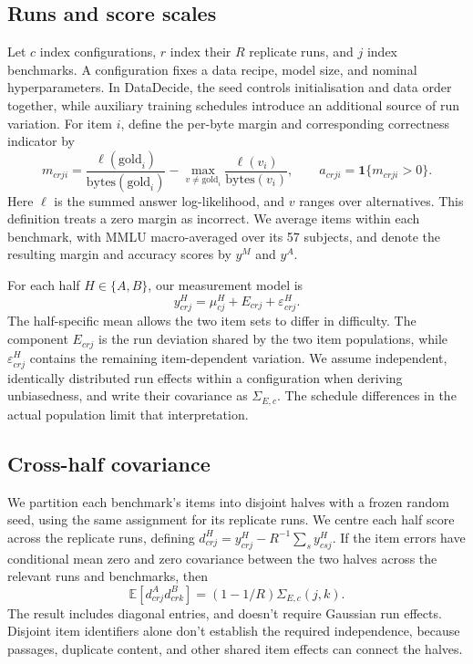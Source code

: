 \documentclass{article}
\begin{document}
\subsection{Runs and score scales}
Let $c$ index configurations, $r$ index their $R$ replicate runs, and $j$ index benchmarks. A configuration fixes a data recipe, model size, and nominal hyperparameters. In DataDecide, the seed controls initialisation and data order together, while auxiliary training schedules introduce an additional source of run variation. For item $i$, define the per-byte margin and corresponding correctness indicator by
\begin{equation}
m_{crji}=\frac{\ell(\mathrm{gold}_i)}{\mathrm{bytes}(\mathrm{gold}_i)}-
\max_{v\ne\mathrm{gold}_i}\frac{\ell(v_i)}{\mathrm{bytes}(v_i)},
\qquad a_{crji}=\mathbf{1}\{m_{crji}>0\}.
\label{eq:scores}
\end{equation}
Here $\ell$ is the summed answer log-likelihood, and $v$ ranges over alternatives. This definition treats a zero margin as incorrect. We average items within each benchmark, with MMLU macro-averaged over its 57 subjects, and denote the resulting margin and accuracy scores by $y^M$ and $y^A$.

For each half $H\in\{A,B\}$, our measurement model is
\begin{equation}
y^H_{crj}=\mu^H_{cj}+E_{crj}+\varepsilon^H_{crj}.
\end{equation}
The half-specific mean allows the two item sets to differ in difficulty. The component $E_{crj}$ is the run deviation shared by the two item populations, while $\varepsilon^H_{crj}$ contains the remaining item-dependent variation. We assume independent, identically distributed run effects within a configuration when deriving unbiasedness, and write their covariance as $\Sigma_{E,c}$. The schedule differences in the actual population limit that interpretation.

\subsection{Cross-half covariance}
We partition each benchmark's items into disjoint halves with a frozen random seed, using the same assignment for its replicate runs. We centre each half score across the replicate runs, defining $d^H_{crj}=y^H_{crj}-R^{-1}\sum_s y^H_{csj}$. If the item errors have conditional mean zero and zero covariance between the two halves across the relevant runs and benchmarks, then
\begin{equation}
\mathbb{E}[d^A_{crj}d^B_{crk}]=(1-1/R)\Sigma_{E,c}(j,k).
\label{eq:identity}
\end{equation}
The result includes diagonal entries, and doesn't require Gaussian run effects. Disjoint item identifiers alone don't establish the required independence, because passages, duplicate content, and other shared item effects can connect the halves.
\end{document}
